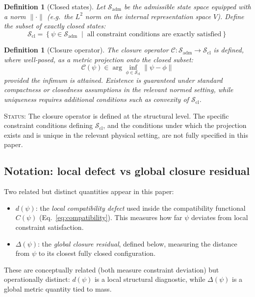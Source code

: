 \documentclass[12pt]{article}
\newtheorem{definition}[theorem]{Definition}
\newcommand{\Ccal}{\mathcal{C}}
\begin{document}
\begin{definition}[Closed states]\label{def:closed}
Let $\mathcal{S}_{\mathrm{adm}}$ be the admissible state space equipped with a norm $\|\cdot\|$ (e.g.\ the $L^2$ norm on the internal representation space $V$). Define the subset of \textit{exactly closed states}:
\begin{equation}
    \mathcal{S}_{\mathrm{cl}} = \left\{\psi \in \mathcal{S}_{\mathrm{adm}} \;\middle|\; \text{all constraint conditions are exactly satisfied}\right\}
\end{equation}
\end{definition}

\begin{definition}[Closure operator]\label{def:closure}
The closure operator $\Ccal : \mathcal{S}_{\mathrm{adm}} \to \mathcal{S}_{\mathrm{cl}}$ is defined, where well-posed, as a metric projection onto the closed subset:
\begin{equation}
    \Ccal(\psi) \in \arg\inf_{\phi \in \mathcal{S}_{\mathrm{cl}}} \|\psi - \phi\|
\end{equation}
provided the infimum is attained. Existence is guaranteed under standard compactness or closedness assumptions in the relevant normed setting, while uniqueness requires additional conditions such as convexity of $\mathcal{S}_{\mathrm{cl}}$.
\end{definition}

\textsc{Status:} The closure operator is defined at the structural level. The specific constraint conditions defining $\mathcal{S}_{\mathrm{cl}}$, and the conditions under which the projection exists and is unique in the relevant physical setting, are not fully specified in this paper.

\subsection{Notation: local defect vs global closure residual}

Two related but distinct quantities appear in this paper:
\begin{itemize}
    \item $d(\psi)$: the \textit{local compatibility defect} used inside the compatibility functional $C(\psi)$ (Eq.~\ref{eq:compatibility}). This measures how far $\psi$ deviates from local constraint satisfaction.
    \item $\Delta(\psi)$: the \textit{global closure residual}, defined below, measuring the distance from $\psi$ to its closest fully closed configuration.
\end{itemize}
These are conceptually related (both measure constraint deviation) but operationally distinct: $d(\psi)$ is a local structural diagnostic, while $\Delta(\psi)$ is a global metric quantity tied to mass.
\end{document}
